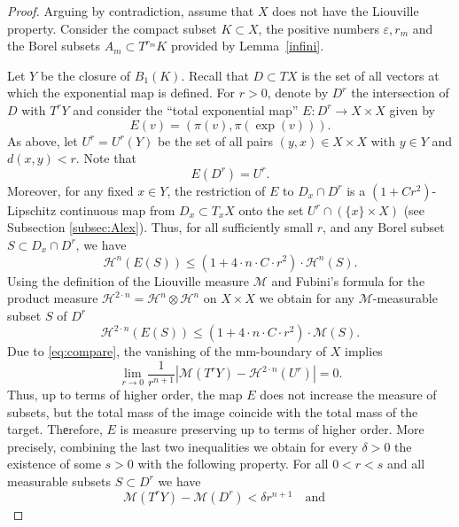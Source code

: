 \documentclass[12pt,leqno,intlimits]{amsart}
\numberwithin{equation}{section}
\theoremstyle{definition}
\theoremstyle{remark}
\newcommand{\lref}[1]{Lemma~\ref{#1}}
\def\:{\colon}
\begin{document}
\begin{proof}
Arguing by contradiction, assume that $X$ does not have the Liouville property. 
Consider the compact subset $K \subset X$, the positive numbers $\varepsilon, r_m$ and the Borel
subsets $A_m\subset T^{r_m} K$ provided by \lref{infini}.

Let $Y$ be the closure of $B_1 (K)$.
Recall that $D\subset TX$ is the set of all vectors at which the exponential map is defined.
For $r>0$, denote by $D^r$ the intersection of $D$ with $T^r Y$ and consider the ``total exponential map''
$E\:D^r \to X\times X$ given by 
$$E(v)= (\pi (v), \pi (\exp (v))).$$
As above, let $U^r =U^r(Y)$ be the set of all
pairs $(y,x) \in X\times X$ with $y\in Y$ and $d(x,y)<r$.
Note that
\begin{equation} \label{eq:image}
E(D^r) =U^r.
\end{equation}
Moreover, for any fixed $x \in Y$, the restriction of $E$ to $D_x \cap D^r$ is
a $(1+ C r^2)$-Lipschitz continuous map from $D_x\subset T_xX$ onto the set $U^r \cap (\{x \} \times X)$ (see Subsection \ref{subsec:Alex}).
Thus, for all sufficiently small $r$, and any Borel subset $S\subset D_x \cap D^r$, we have
$$\mathcal H^n (E(S)) \leq (1+4{\cdot} n{\cdot}  C{\cdot}  r^2)\cdot \mathcal H^n (S).$$
Using the definition of the Liouville measure $\mathcal M$ and Fubini's formula for the product measure
$\mathcal H^{2\cdot n} =\mathcal H^n \otimes \mathcal H^n $ on $X\times X$ we obtain for any $\mathcal M$-measurable subset $S$ of $D^r$
\begin{equation} \label{eq:contract}
\mathcal H^{2\cdot n} (E(S)) \leq (1+4{\cdot} n{\cdot} C{\cdot}  r^2) \cdot \mathcal M(S).
\end{equation}
Due to \eqref{eq:compare}, the vanishing  of the mm-boundary of $X$ implies
$$\lim _{r\to 0} \frac 1 {r^{n+1} } |\mathcal M(T^{r} Y) -\mathcal H^{2\cdot n} (U^r)| =0.$$
Thus, up to terms of higher order, the map $E$ does not increase the measure of subsets, but the total mass of the image
coincide with the total mass of the target.
Thеrefore, $E$ is measure preserving up to terms of higher order.
More precisely, combining the last two inequalities we obtain for every $\delta >0$ the existence of some $s>0$ with the following property. For all $0<r<s$ and all measurable subsets $S\subset D^r$
we have
\begin{equation} \label{eq:almostall}
\mathcal M (T^r Y)- \mathcal M (D^r) < \delta r^{n+1}
\quad\text{and}\quad

\end{equation}
\end{proof}
\end{document}
